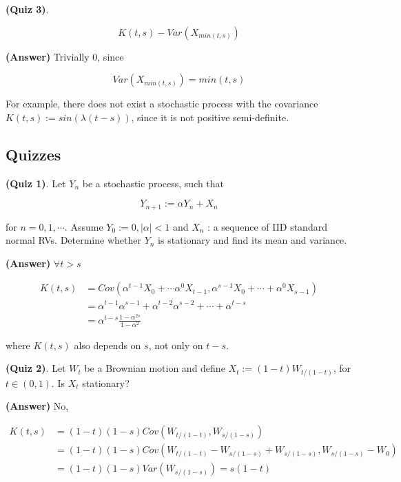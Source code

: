 \documentclass[12pt]{article}
\theoremstyle{nonumberbreak}
\begin{document}
\textbf{(Quiz 3)}. 


$$
K(t,s) - Var(X_{min(t,s)})
$$


\textbf{(Answer)} Trivially $0$, since

$$
Var(X_{min(t,s)}) = min(t,s)
$$




\pagebreak




For example, there does not exist a stochastic process with the covariance $K(t,s) := sin( \lambda (t-s) )$, since it is not positive semi-definite.


\subsection*{Quizzes}

\textbf{(Quiz 1)}. Let $Y_n$ be a stochastic process, such that

$$
Y_{n+1} := \alpha Y_n + X_n
$$

for $n=0, 1, \cdots$. Assume $Y_0 := 0, |\alpha| < 1$ and $X_n$ : a sequence of IID standard normal RVs. Determine whether $Y_n$ is stationary and find its mean and variance.


\textbf{(Answer)} $\forall t > s$

$$
\begin{aligned}
K(t,s) &= Cov(\alpha^{t-1} X_0 + \cdots \alpha^0 X_{t-1}, \alpha^{s-1} X_0 + \cdots + \alpha^0 X_{s-1}) \\[8pt]
&= \alpha^{t-1} \alpha^{s-1} + \alpha^{t-2} \alpha^{s-2} + \cdots + \alpha^{t-s} \\[8pt]
&= \alpha^{t-s} \frac{1-\alpha^{2s}}{1-\alpha^2}
\end{aligned}
$$

where $K(t,s)$ also depends on $s$, not only on $t-s$.




\textbf{(Quiz 2)}. Let $W_t$ be a Brownian motion and define $X_t := (1-t) W_{t/(1-t)}$, for $t \in (0,1)$. Is $X_t$ stationary? 

\textbf{(Answer)} No,

$$
\begin{aligned}
K(t,s) &= (1-t)(1-s) Cov(W_{t/(1-t)}, W_{s/(1-s)}) \\[8pt]
&= (1-t)(1-s) Cov(W_{t/(1-t)} - W_{s/(1-s)} + W_{s/(1-s)}, W_{s/(1-s)} - W_0) \\[8pt]
&= (1-t)(1-s) Var(W_{s/(1-s)}) = s(1-t)
\end{aligned}
$$
\end{document}
